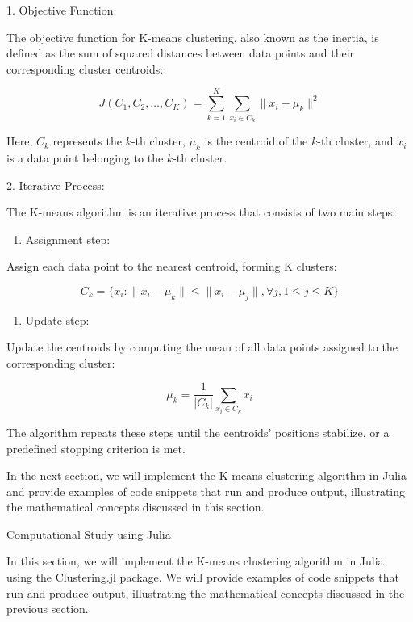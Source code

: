 \documentclass[11pt]{article}
\providecommand{\tightlist}{%
      \setlength{\itemsep}{0pt}\setlength{\parskip}{0pt}}
\begin{document}
    {1. Objective Function:}

The objective function for K-means clustering, also known as the
inertia, is defined as the sum of squared distances between data points
and their corresponding cluster centroids:

    \[
J(C_1, C_2, \dots, C_K) = \sum_{k=1}^{K} \sum_{x_i \in C_k} \| x_i - \mu_k \|^2
\]

    Here, \(C_k\) represents the \(k\)-th cluster, \(\mu_k\) is the centroid
of the \(k\)-th cluster, and \(x_i\) is a data point belonging to the
\(k\)-th cluster.

    {2. Iterative Process:}

The K-means algorithm is an iterative process that consists of two main
steps:

    \begin{enumerate}
\def\labelenumi{\alph{enumi}.}
\tightlist
\item
  {Assignment step:}
\end{enumerate}

Assign each data point to the nearest centroid, forming K clusters:

    \[
C_k = \{ x_i : \| x_i - \mu_k \| \leq \| x_i - \mu_j \|, \forall j, 1 \leq j \leq K \}
\]

    \begin{enumerate}
\def\labelenumi{\alph{enumi}.}
\setcounter{enumi}{1}
\tightlist
\item
  {Update step:}
\end{enumerate}

Update the centroids by computing the mean of all data points assigned
to the corresponding cluster:

    \[
\mu_k = \frac{1}{|C_k|} \sum_{x_i \in C_k} x_i
\]

    The algorithm repeats these steps until the centroids' positions
stabilize, or a predefined stopping criterion is met.

    In the next section, we will implement the K-means clustering algorithm
in Julia and provide examples of code snippets that run and produce
output, illustrating the mathematical concepts discussed in this
section.

    {Computational Study using Julia}

    In this section, we will implement the K-means clustering algorithm in
Julia using the Clustering.jl package. We will provide examples of code
snippets that run and produce output, illustrating the mathematical
concepts discussed in the previous section.
\end{document}
